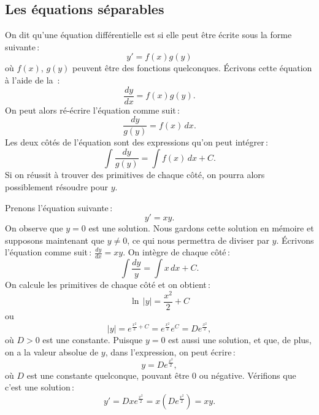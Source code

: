 \subsection{Les équations séparables}

On dit qu'une équation différentielle est
\emph{}
si elle peut être écrite sous la forme suivante\,: 
\begin{equation*}
y' = f(x)g(y) 
\end{equation*}
où $f(x)$, $g(y)$ peuvent être des fonctions quelconques.
Écrivons cette équation à l'aide de la \,: 
\begin{equation*}
\frac{dy}{dx} = f(x)g(y) .
\end{equation*}
On peut alors ré-écrire l'équation comme suit\,: 
\begin{equation*}
\frac{dy}{g(y)} = f(x) \,dx .
\end{equation*}
Les deux côtés de l'équation sont des expressions qu'on peut intégrer\,: 
\begin{equation*}
\int \frac{dy}{g(y)} = \int f(x) \,dx + C .
\end{equation*}
Si on réussit à trouver des primitives de chaque côté, on pourra alors possiblement résoudre pour $y$.

\begin{example} \label{example:yprimeisxy}
Prenons l'équation  suivante\,: 
\begin{equation*}
y' = xy .
\end{equation*}
On observe que $y=0$ est une solution.  Nous gardons cette solution en mémoire et supposons maintenant que 
$y \not =0$, ce qui nous permettra de diviser par $y$.
Écrivons l'équation comme suit\,: $\frac{dy}{dx} = xy$.  On intègre de chaque côté\,: 
\begin{equation*}
\int \frac{dy}{y} = \int x\,dx + C .
\end{equation*}
On calcule les primitives de chaque côté et on obtient\,:
\begin{equation*}
\ln \, \lvert y\rvert = \frac{x^2}{2} + C 
\end{equation*}
ou
\begin{equation*}
\lvert y \rvert = e^{\frac{x^2}{2} + C} = e^{\frac{x^2}{2}} e^C = D e^{\frac{x^2}{2}} ,
\end{equation*}
où $D > 0$ est une constante.  Puisque $y=0$ est aussi une solution, et que, de plus, on a la valeur absolue de $y$, dans l'expression, on peut écrire\,: 
%
\begin{equation*}
y = D e^{\frac{x^2}{2}} ,
\end{equation*}
où $D$ est une constante quelconque, pouvant être 0 ou négative.  Vérifions que c'est une solution\,: 
\begin{equation*}
y' = D x e^{\frac{x^2}{2}} = x \left( D e^{\frac{x^2}{2}} \right) = xy .
\end{equation*}
\end{example}

